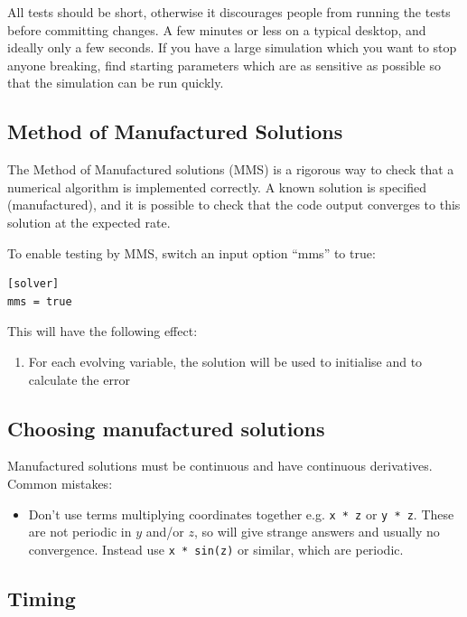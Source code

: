 \documentclass[12pt]{article}
\begin{document}
All tests should be short, otherwise it discourages people from running the tests before committing changes. A few minutes or less on a typical desktop, and ideally only a few seconds. If you have a large simulation which you want
to stop anyone breaking, find starting parameters which are as sensitive as possible so that the simulation
can be run quickly.

\subsection{Method of Manufactured Solutions}

The Method of Manufactured solutions (MMS) is a rigorous way to check
that a numerical algorithm is implemented correctly. A known
solution is specified (manufactured), and it is possible to check that
the code output converges to this solution at the expected rate.

To enable testing by MMS, switch an input option ``mms'' to true:
\begin{lstlisting}
[solver]
mms = true
\end{lstlisting}
This will have the following effect:
\begin{enumerate}
\item For each evolving variable, the solution will be used to initialise
  and to calculate the error
\end{enumerate}

\subsection{Choosing manufactured solutions}

Manufactured solutions must be continuous and have continuous derivatives.
Common mistakes:
\begin{itemize}
\item Don't use terms multiplying coordinates together e.g. \texttt{x * z} or \texttt{y * z}. These are not periodic in $y$ and/or $z$, so will give strange answers and usually no convergence. Instead use \texttt{x * sin(z)} or similar, which are periodic.
\end{itemize}

\subsection{Timing}
\label{sec:timerclass}
\end{document}
